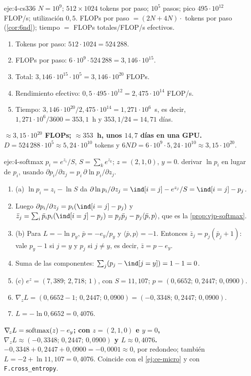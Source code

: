 \begin{solucion}{eje:4-cs336}
\datos $N=10^{9}$; $512\times 1024$ tokens por paso; $10^{5}$ pasos; pico $495\cdot 10^{12}$ FLOP/s; utilización $0{,}5$.
\planteamiento FLOPs por paso $=(2N+4N)\cdot$ tokens por paso (\cref{cor:6nd}); tiempo $=$ FLOPs totales$/$FLOP/s efectivos.
\pasos
\begin{enumerate}[label=\arabic*.]
  \item Tokens por paso: $512\cdot 1024=524\,288$.
  \item FLOPs por paso: $6\cdot 10^{9}\cdot 524\,288=3{,}146\cdot 10^{15}$.
  \item Total: $3{,}146\cdot 10^{15}\cdot 10^{5}=3{,}146\cdot 10^{20}$ FLOPs.
  \item Rendimiento efectivo: $0{,}5\cdot 495\cdot 10^{12}=2{,}475\cdot 10^{14}$ FLOP/s.
  \item Tiempo: $3{,}146\cdot 10^{20}/2{,}475\cdot 10^{14}=1{,}271\cdot 10^{6}$~s, es decir, $1{,}271\cdot 10^{6}/3600=353{,}1$~h y $353{,}1/24=14{,}71$ días.
\end{enumerate}
\resultado \textbf{$\approx 3{,}15\cdot 10^{20}$ FLOPs; $\approx 353$~h, unos $14{,}7$ días en una GPU.}
\comprobacion $D=524\,288\cdot 10^{5}\approx 5{,}24\cdot 10^{10}$ tokens y $6ND=6\cdot 10^{9}\cdot 5{,}24\cdot 10^{10}\approx 3{,}15\cdot 10^{20}$.
\end{solucion}

\begin{solucion}{eje:4-softmax}
\datos $p_i=e^{z_i}/S$, $S=\sum_ke^{z_k}$; $z=(2,1,0)$, $y=0$.
\planteamiento derivar $\ln p_i$ en lugar de $p_i$, usando $\partial p_i/\partial z_j=p_i\,\partial\ln p_i/\partial z_j$.
\pasos
\begin{enumerate}[label=\arabic*.]
  \item (a) $\ln p_i=z_i-\ln S$ da $\partial\ln p_i/\partial z_j=\ind[i=j]-e^{z_j}/S=\ind[i=j]-p_j$.
  \item Luego $\partial p_i/\partial z_j=p_i(\ind[i=j]-p_j)$ y $\bar z_j=\sum_i\bar p_ip_i(\ind[i=j]-p_j)=p_j\bar p_j-p_j\langle\bar p,p\rangle$, que es la \cref{prop:vjp-softmax}.
  \item (b) Para $L=-\ln p_y$, $\bar p=-e_y/p_y$ y $\langle\bar p,p\rangle=-1$. Entonces $\bar z_j=p_j(\bar p_j+1)$: vale $p_y-1$ si $j=y$ y $p_j$ si $j\ne y$, es decir, $\bar z=p-e_y$.
  \item Suma de las componentes: $\sum_j(p_j-\ind[j=y])=1-1=0$.
  \item (c) $e^{z}=(7{,}389;\,2{,}718;\,1)$, con $S=11{,}107$; $p=(0{,}6652;\,0{,}2447;\,0{,}0900)$.
  \item $\nabla_{\!z}L=(0{,}6652-1;\,0{,}2447;\,0{,}0900)=(-0{,}3348;\,0{,}2447;\,0{,}0900)$.
  \item $L=-\ln 0{,}6652=0{,}4076$.
\end{enumerate}
\resultado \textbf{$\nabla_{\!z}L=\operatorname{softmax}(z)-e_y$; con $z=(2,1,0)$ e $y=0$, $\nabla_{\!z}L\approx(-0{,}3348;\,0{,}2447;\,0{,}0900)$ y $L\approx 0{,}4076$.}
\comprobacion $-0{,}3348+0{,}2447+0{,}0900=-0{,}0001\approx 0$, por redondeo; también $L=-2+\ln 11{,}107=0{,}4076$. Coincide con el \cref{ej:ce-micro} y con \texttt{F.cross\_entropy}.
\end{solucion}

